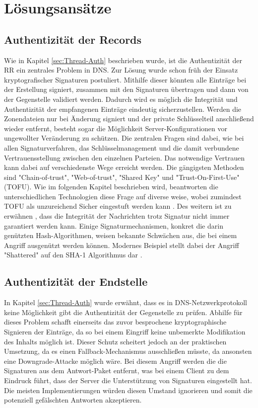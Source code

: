 \chapter{Lösungsansätze}

\section{Authentizität der Records}
\label{sec:Solution-RecordAuth}

Wie in Kapitel \ref{sec:Thread-Auth} beschrieben wurde, ist die Authentizität der RR ein zentrales Problem in DNS. Zur Lösung wurde schon früh der Einsatz kryptografischer Signaturen postuliert. Mithilfe dieser könnten alle Einträge bei der Erstellung signiert, zusammen mit den Signaturen übertragen und dann von der Gegenstelle validiert werden. Dadurch wird es möglich die Integrität und Authentizität der empfangenen Einträge eindeutig sicherzustellen. Werden die Zonendateien nur bei Änderung signiert und der private Schlüsselteil anschließend wieder entfernt, besteht sogar die Möglichkeit Server-Konfigurationen vor ungewollter Veränderung zu schützen. 
Die zentralen Fragen sind dabei, wie bei allen Signaturverfahren, das Schlüsselmanagement und die damit verbundene Vertrauensstellung zwischen den einzelnen Parteien. Das notwendige Vertrauen kann dabei auf verschiedenste Wege erreicht werden. Die gängigsten Methoden sind "Chain-of-trust", "Web-of-trust", "Shared Key" und "Trust-On-First-Use" (TOFU). Wie im folgenden Kapitel beschrieben wird, beantworten die unterschiedlichen Technologien diese Frage auf diverse weise, wobei zumindest TOFU als unzureichend Sicher eingestuft werden kann \cite{Wendlandt2008}.
Des weitern ist zu erwähnen , dass die Integrität der Nachrichten trotz Signatur nicht immer garantiert werden kann. Einige Signaturmechanismen, konkret die darin genützten Hash-Algorithmen, weisen bekannte Schwächen aus, die bei einem Angriff ausgenützt werden können. Modernes Beispiel stellt dabei der Angriff "Shattered" auf den SHA-1 Algorithmus dar \cite{Stevens2017}. 

\section{Authentizität der Endstelle}

In Kapitel \ref{sec:Thread-Auth} wurde erwähnt, dass es in DNS-Netzwerkprotokoll keine Möglichkeit gibt die Authentizität der Gegenstelle zu prüfen. Abhilfe für dieses Problem schafft einerseits das zuvor besprochene kryptographische Signieren der Einträge, da so bei einem Eingriff keine unbemerkte Modifikation des Inhalts möglich ist. Dieser Schutz scheitert jedoch an der praktischen Umsetzung, da es einen Fallback-Mechanismus ausschließen müsste, da ansonsten eine Downgrade-Attacke möglich wäre. Bei diesem Angriff werden die die Signaturen aus dem Antwort-Paket entfernt, was bei einem Client zu dem Eindruck führt, dass der Server die Unterstützung von Signaturen eingestellt hat. Die meisten Implementierungen würden diesen Umstand ignorieren und somit die potenziell gefälschten Antworten akzeptieren.  

